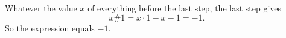 Whatever the value \(x\) of everything before the last step, the last step gives
\[
x\#1=x\cdot 1-x-1=-1.
\]
So the expression equals \(\boxed{-1}\).
